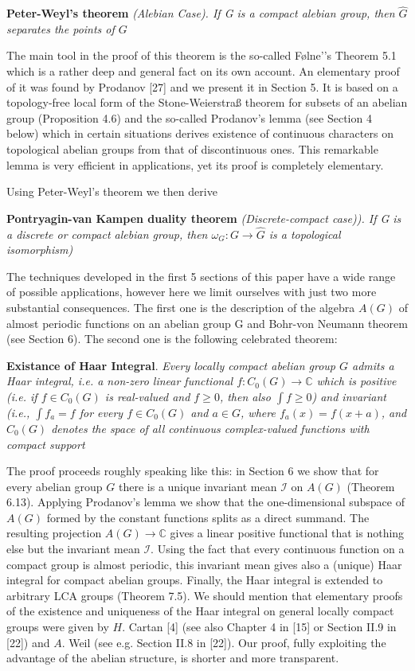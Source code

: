 \documentclass[12pt]{article}
\begin{document}
    \textbf{Peter-Weyl's theorem} \emph{(Alebian Case). If G is a compact alebian group, then $\widehat{G}$ separates the points of $G$}


        The main tool in the proof of this theorem is the so-called Følne'’s Theorem 5.1 which is a rather deep and general
    fact on its own account. An elementary proof of it was found by Prodanov [27] and we present it in Section 5. It is based
    on a topology-free local form of the Stone-Weierstraß theorem for subsets of an abelian group (Proposition 4.6) and the
    so-called Prodanov's lemma (see Section 4 below) which in certain situations derives existence of continuous characters on
    topological abelian groups from that of discontinuous ones. This remarkable lemma is very efficient in applications, yet its
    proof is completely elementary.


    Using Peter-Weyl's theorem we then derive


    \textbf{Pontryagin-van Kampen duality theorem} \emph{(Discrete-compact case)). If G is a discrete or compact alebian group, then $\omega_G : G \to \widehat{G}$ is a topological isomorphism)}


        The techniques developed in the first 5 sections of this paper have a wide range of possible applications, however here
    we limit ourselves with just two more substantial consequences. The first one is the description of the algebra $A(G)$ of
    almost periodic functions on an abelian group G and Bohr-von Neumann theorem (see Section 6). The second one is the
    following celebrated theorem:


    \textbf{Existance of Haar Integral}. \emph{Every locally compact abelian group $G$ admits a Haar integral, i.e. a non-zero linear functional
    $f : C_0 (G) → \mathbb{C}$ which is positive (i.e. if $f \in C_0 (G)$ is real-valued and $f \geqslant 0$, then also  $\int f \geqslant 0$) and invariant (i.e.,  $\int f_a =  f$ for
    every $f \in C_0(G)$ and $a \in G$, where $f_a (x) = f (x + a)$, and $C_0 (G)$ denotes the space of all continuous complex-valued functions with
    compact support}


        The proof proceeds roughly speaking like this: in Section 6 we show that for every abelian group $G$ there is a unique
    invariant mean $\mathcal{I}$ on $A(G)$ (Theorem 6.13). Applying Prodanov’s lemma we show that the one-dimensional subspace of $A(G)$
    formed by the constant functions splits as a direct summand. The resulting projection $A(G) \to \mathbb{C}$ gives a linear positive
    functional that is nothing else but the invariant mean $\mathcal{I}$. Using the fact that every continuous function on a compact group
    is almost periodic, this invariant mean gives also a (unique) Haar integral for compact abelian groups. Finally, the Haar
    integral is extended to arbitrary LCA groups (Theorem 7.5). We should mention that elementary proofs of the existence and
    uniqueness of the Haar integral on general locally compact groups were given by $H$. Cartan [4] (see also Chapter 4 in [15]
    or Section II.9 in [22]) and $A$. Weil (see e.g. Section II.8 in [22]). Our proof, fully exploiting the advantage of the abelian
    structure, is shorter and more transparent.
\end{document}

